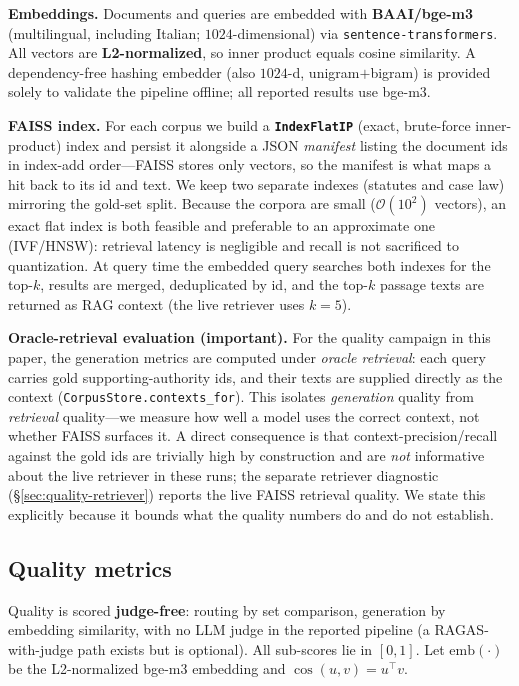 \documentclass[11pt]{article}
\begin{document}
\textbf{Embeddings.} Documents and queries are embedded with \textbf{BAAI/bge-m3}
(multilingual, including Italian; $1024$-dimensional) via \texttt{sentence-trans\-formers}.
All vectors are \textbf{L2-normalized}, so inner product equals cosine similarity.
A dependency-free hashing embedder (also $1024$-d, unigram$+$bigram) is provided
solely to validate the pipeline offline; all reported results use bge-m3.

\textbf{FAISS index.} For each corpus we build a \textbf{\texttt{IndexFlatIP}}
(exact, brute-force inner-product) index and persist it alongside a JSON
\emph{manifest} listing the document ids in index-add order---FAISS stores only
vectors, so the manifest is what maps a hit back to its id and text. We keep two
separate indexes (statutes and case law) mirroring the gold-set split. Because the
corpora are small ($\mathcal{O}(10^2)$ vectors), an exact flat index is both
feasible and preferable to an approximate one (IVF/HNSW): retrieval latency is
negligible and recall is not sacrificed to quantization. At query time the
embedded query searches both indexes for the top-$k$, results are merged,
deduplicated by id, and the top-$k$ passage texts are returned as RAG context (the
live retriever uses $k{=}5$).

\textbf{Oracle-retrieval evaluation (important).} For the quality campaign in this
paper, the generation metrics are computed under \emph{oracle retrieval}: each
query carries gold supporting-authority ids, and their texts are supplied directly
as the context (\texttt{CorpusStore.contexts\_for}). This isolates
\emph{generation} quality from \emph{retrieval} quality---we measure how well a
model uses the correct context, not whether FAISS surfaces it. A direct consequence
is that context-precision/recall against the gold ids are trivially high by
construction and are \emph{not} informative about the live retriever in these runs;
the separate retriever diagnostic (§\ref{sec:quality-retriever}) reports the live
FAISS retrieval quality. We state this explicitly because it bounds what the quality
numbers do and do not establish.

\subsection{Quality metrics}
\label{sec:setting-metrics}
Quality is scored \textbf{judge-free}: routing by set comparison, generation by
embedding similarity, with no LLM judge in the reported pipeline (a RAGAS-with-judge
path exists but is optional). All sub-scores lie in $[0,1]$. Let $\mathrm{emb}(\cdot)$
be the L2-normalized bge-m3 embedding and $\cos(u,v)=u^\top v$.
\end{document}
